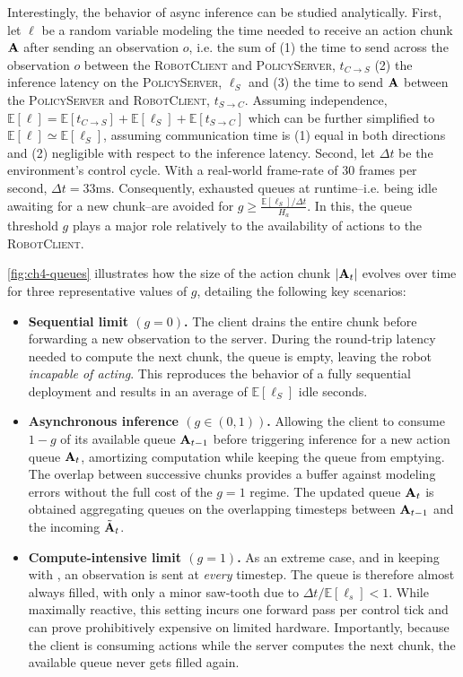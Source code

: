 Interestingly, the behavior of async inference can be studied analytically. First, let \( \ell \) be a random variable modeling the time needed to receive an action chunk \( \mathbf{A} \) after sending an observation \( o \), i.e. the sum of (1) the time to send across the observation \( o \) between the \textsc{RobotClient} and \textsc{PolicyServer}, \( t_{C \to S}\) (2) the inference latency on the \textsc{PolicyServer}, \( \ell_S \) and (3) the time to send \( \mathbf{A} \) between the \textsc{PolicyServer} and \textsc{RobotClient}, \( t_{S \to C} \). Assuming independence, \( \mathbb E [\ell] = \mathbb E[t_{C \to S}] + \mathbb E[\ell_S] + \mathbb E[t_{S \to C}] \) which can be further simplified to \( \mathbb E[\ell] \simeq \mathbb E[\ell_S]  \), assuming communication time is (1) equal in both directions and (2) negligible with respect to the inference latency. Second, let \(\Delta t\) be the environment’s control cycle. With a real-world frame-rate of 30 frames per second, \(\Delta t=33\text{ms}\). Consequently, exhausted queues at runtime--i.e. being idle awaiting for a new chunk--are avoided for \( g \geq \frac{\mathbb E[\ell_S] / \Delta t}{H_a} \). In this, the queue threshold \( g \) plays a major role relatively to the availability of actions to the \textsc{RobotClient}.

\ref{fig:ch4-queues} illustrates how the size of the action chunk \(\lvert \mathbf{A}_t \rvert\) evolves over time for three representative values of \(g\), detailing the following key scenarios:
\begin{itemize}
    \item \textbf{Sequential limit \((g=0)\).} The client drains the entire chunk before forwarding a new observation to the server. During the round-trip latency needed to compute the next chunk, the queue is empty, leaving the robot \emph{incapable of acting}.  This reproduces the behavior of a fully sequential deployment and results in an average of \( \mathbb E[\ell_S] \) idle seconds.
    \item \textbf{Asynchronous inference \((g \in (0,1))\).} Allowing the client to consume \(1-g\) of its available queue \( \mathbf{A}_{t-1}\) before triggering inference for a new action queue \( \mathbf{A}_{t} \), amortizing computation while keeping the queue from emptying. The overlap between successive chunks provides a buffer against modeling errors without the full cost of the \(g=1\) regime. The updated queue \( \mathbf{A}_t\) is obtained aggregating queues on the overlapping timesteps between \( \mathbf{A}_{t-1}\) and the incoming \(\tilde{\mathbf{A}}_{t}\).
    \item \textbf{Compute-intensive limit \((g=1)\).}  As an extreme case, and in keeping with \citet{zhaoLearningFineGrainedBimanual2023}, an observation is sent at \emph{every} timestep. The queue is therefore almost always filled, with only a minor saw-tooth due to \(\Delta t/\mathbb E[\ell_s] < 1\). While maximally reactive, this setting incurs one forward pass per control tick and can prove prohibitively expensive on limited hardware. Importantly, because the client is consuming actions while the server computes the next chunk, the available queue never gets filled again.
\end{itemize}

